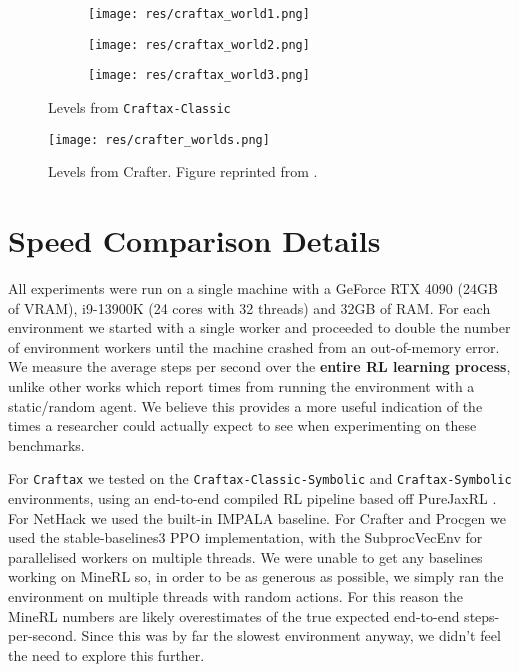 \documentclass{article}
\theoremstyle{plain}
\theoremstyle{definition}
\theoremstyle{remark}
\begin{document}
\begin{figure*}
    \centering
    \begin{subfigure}{0.3\linewidth}
        \texttt{[image: res/craftax\_world1.png]}
    \end{subfigure}\hfill%
    \begin{subfigure}{0.3\linewidth}
        \texttt{[image: res/craftax\_world2.png]}
    \end{subfigure}\hfill%
    \begin{subfigure}{0.3\linewidth}
        \texttt{[image: res/craftax\_world3.png]}
    \end{subfigure}\hfill%
    \caption{Levels from \texttt{Craftax-Classic}}
    \label{fig:app_craftax_classic_levels}

    \vspace{1cm}
    
    \centering
    \texttt{[image: res/crafter\_worlds.png]}
    
    \caption{Levels from Crafter.  Figure reprinted from \citet{hafner2021benchmarking}.}
    \label{fig:app_crafter_levels}
\end{figure*}

\begin{figure*}
\end{figure*}

\section{Speed Comparison Details} \label{app:speed_comparison}

All experiments were run on a single machine with a GeForce RTX 4090 (24GB of VRAM), i9-13900K (24 cores with 32 threads) and 32GB of RAM.  For each environment we started with a single worker and proceeded to double the number of environment workers until the machine crashed from an out-of-memory error.  We measure the average steps per second over the \textbf{entire RL learning process}, unlike other works which report times from running the environment with a static/random agent.  We believe this provides a more useful indication of the times a researcher could actually expect to see when experimenting on these benchmarks.

For \texttt{Craftax} we tested on the \texttt{Craftax-Classic-Symbolic} and \texttt{Craftax-Symbolic} environments, using an end-to-end compiled RL pipeline based off PureJaxRL \citep{lu2022discovered}.  For NetHack we used the built-in IMPALA baseline.  For Crafter and Procgen we used the stable-baselines3 \citep{sb3} PPO implementation, with the SubprocVecEnv for parallelised workers on multiple threads.  We were unable to get any baselines working on MineRL so, in order to be as generous as possible, we simply ran the environment on multiple threads with random actions.  For this reason the MineRL numbers are likely overestimates of the true expected end-to-end steps-per-second.  Since this was by far the slowest environment anyway, we didn't feel the need to explore this further.
\end{document}
